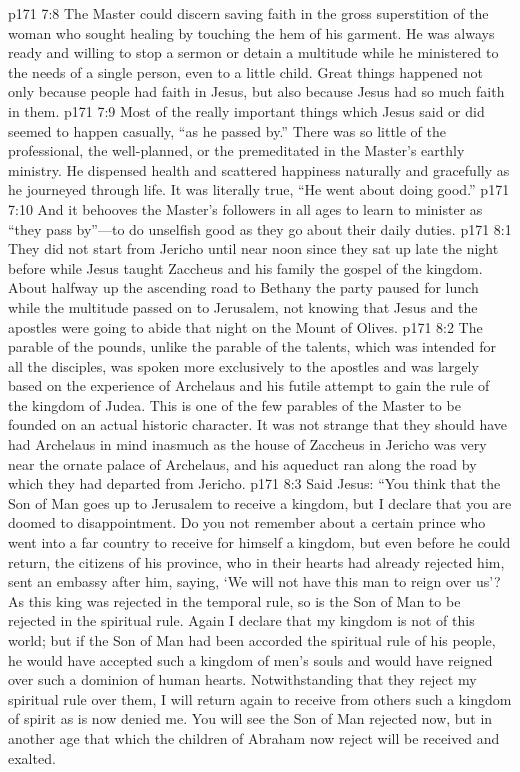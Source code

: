 \vs p171 7:8 The Master could discern saving faith in the gross superstition of the woman who sought healing by touching the hem of his garment. He was always ready and willing to stop a sermon or detain a multitude while he ministered to the needs of a single person, even to a little child. Great things happened not only because people had faith in Jesus, but also because Jesus had so much faith in them.\plusone
\vs p171 7:9 Most of the really important things which Jesus said or did seemed to happen casually, “as he passed by.” There was so little of the professional, the well\hyp{}planned, or the premeditated in the Master’s earthly ministry. He dispensed health and scattered happiness naturally and gracefully as he journeyed through life. It was literally true, “He went about doing good.”
\vs p171 7:10 And it behooves the Master’s followers in all ages to learn to minister as “they pass by”---to do unselfish good as they go about their daily duties.
\vs p171 8:1 They did not start from Jericho until near noon since they sat up late the night before while Jesus taught Zaccheus and his family the gospel of the kingdom. About halfway up the ascending road to Bethany the party paused for lunch while the multitude passed on to Jerusalem, not knowing that Jesus and the apostles were going to abide that night on the Mount of Olives.
\vs p171 8:2 The parable of the pounds, unlike the parable of the talents, which was intended for all the disciples, was spoken more exclusively to the apostles and was largely based on the experience of Archelaus and his futile attempt to gain the rule of the kingdom of Judea. This is one of the few parables of the Master to be founded on an actual historic character. It was not strange that they should have had Archelaus in mind inasmuch as the house of Zaccheus in Jericho was very near the ornate palace of Archelaus, and his aqueduct ran along the road by which they had departed from Jericho.
\pc \vs p171 8:3 Said Jesus: \textcolor{ubdarkred}{“You think that the Son of Man goes up to Jerusalem to receive a kingdom, but I declare that you are doomed to disappointment. Do you not remember about a certain prince who went into a far country to receive for himself a kingdom, but even before he could return, the citizens of his province, who in their hearts had already rejected him, sent an embassy after him, saying, ‘We will not have this man to reign over us’? As this king was rejected in the temporal rule, so is the Son of Man to be rejected in the spiritual rule. Again I declare that my kingdom is not of this world; but if the Son of Man had been accorded the spiritual rule of his people, he would have accepted such a kingdom of men’s souls and would have reigned over such a dominion of human hearts. Notwithstanding that they reject my spiritual rule over them, I will return again to receive from others such a kingdom of spirit as is now denied me. You will see the Son of Man rejected now, but in another age that which the children of Abraham now reject will be received and exalted.}
